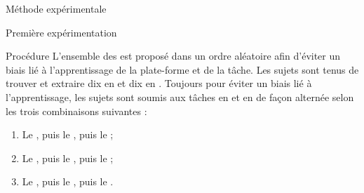 \documentclass[myfrancais]{mythesis}
\begin{document}
\begin{mychapter}{Méthode expérimentale}
\begin{mysection}{Première expérimentation}
\begin{mysubsection}{Procédure}
				L'ensemble des  est proposé dans un ordre aléatoire afin d'éviter un biais lié à l'apprentissage de la plate-forme et de la tâche.
				Les sujets sont tenus de trouver et extraire dix  en  et dix  en .
				Toujours pour éviter un biais lié à l'apprentissage, les sujets sont soumis aux tâches en  et en  de façon alternée selon les trois combinaisons suivantes :
				\begin{enumerate}
					\item Le  , puis le  , puis le  ;
					\item Le  , puis le  , puis le  ;
					\item Le  , puis le  , puis le  .
				\end{enumerate}


\end{mysubsection}
\end{mysection}
\end{mychapter}
\end{document}
